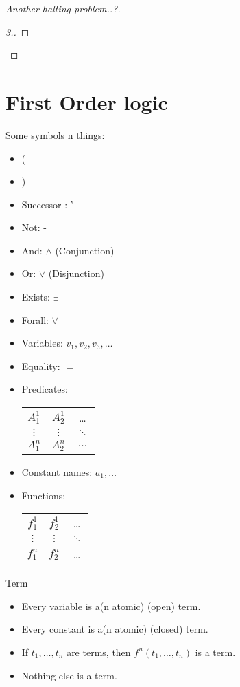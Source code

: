 \begin{proof}[Another halting problem..?]
\begin{proof}[3.]
\end{proof}
\end{proof}


\chapter{First Order logic}
Some symbols n things:
\begin{itemize}
\item ( 
\item ) 
\item Successor : ' %
\item Not: -
\item And: $\wedge$ (Conjunction)
\item Or: $\vee$ (Disjunction)
\item Exists: $\exists$ 
\item Forall: $\forall$
\item Variables: $v_1, v_2, v_3, \dots$
\item Equality: $=$
\item Predicates: \begin{tabular}{c c c}
 $A^{1}_1$ & $A^{1}_2$  & \dots \\
 $\vdots $ & $\vdots$   & $\ddots$ \\
 $A^{n}_1$ & $A^{n}_2$  & $\dots$ \\
\end{tabular}
\item Constant names: $a_1, \dots$
\item Functions: \begin{tabular}{c c c}
 $f^{1}_1$ & $f^{1}_2$ & \dots \\
 $\vdots$    & $\vdots$ & $\ddots$ \\
 $f^{n}_1$ & $f^{n}_2$ & \dots \\
\end{tabular}
\end{itemize}

\begin{definition}Term
\begin{itemize}
\item Every variable is a(n atomic) (open) term.
\item Every constant is a(n atomic) (closed) term. %
\item If $t_1,\dots,t_n$ are terms, then $f^n(t_1,\dots,t_n)$ is a term.  
\item Nothing else is a term.
\end{itemize}
\end{definition}

